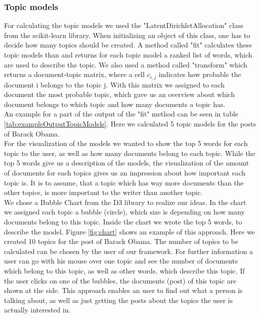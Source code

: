 \subsubsection{Topic models}
For calculating the topic models we used the "LatentDirichletAllocation" class from the scikit-learn library. When initializing an object of this class, one has to  decide how many topics should be created. A method called "fit" calculates these topic models than and returns for each topic model a ranked list of words, which are used to describe the topic. We also used a method called  "transform" which returns 
a document-topic matrix, where a cell $ c_{i,j} $ indicates how probable the document i belongs to the topic j. With this matrix we assigned to each document the most probable topic, which gave us an overview about which document belongs to which topic and  how many documents a topic has.  \\
An example for a part of the  output of the "fit" method can be seen in table \ref{tab:exampleOutputTopicModels}. Here we calculated 5 topic models for the posts of Barack Obama. \\
For the visualization of the models we wanted to show the top 5 words for each topic to the user, as well as how many documents belong to each topic. While the top 5 words give us a description of the models, the visualization of the amount of documents for each topics gives us an impression about how important each topic is. It is to assume, that a topic which has way more documents than the other topics, is more important to the writer than another  topic. \\
We chose a Bubble Chart from the D3 library to realize our ideas. In the chart we assigned each topic a bubble (circle), which size is depending on how many documents belong to this topic. Inside the chart we wrote the top 5 words, to describe the model. Figure \ref{fig:chart} shows an example of this approach. Here we created 10 topics for the post of Barack Obama. The number of topics to be calculated can be chosen by the user of our framework. For further information a user can go with his mouse over one topic and see the number of documents which belong to this topic, as well as other words, which describe this topic. If the user clicks on one of the bubbles, the documents (post) of this topic are shown at the side. This approach enables an user to find out what a person is talking about, as well as just getting the posts about the topics the user is actually interested in. 

